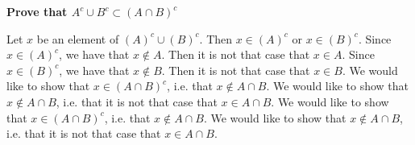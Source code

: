 \documentclass[a4paper,twoside,12pt]{article} %
\makeatletter
\DeclareRobustCommand{\_}{%
  \leavevmode\vbox{%
    \hrule\@width.4em
          \@height-.16ex
          \@depth\dimexpr.16ex+.28pt\relax}}
\makeatother
\begin{document}
{\begin{center} \large \textbf{Prove that $A^c \cup B^c \subset (A \cap B)^c $}\end{center}}\nopagebreak[4]

\begin{center}
\begin{minipage}{120mm}
Let $x$ be an element of $(A)^c\cup (B)^c$. Then $x\in (A)^c$ or $x\in (B)^c$. Since $x\in (A)^c$, we have that $x\notin A$. Then it is not that case that $x\in A$. Since $x\in (B)^c$, we have that $x\notin B$. Then it is not that case that $x\in B$. We would like to show that $x\in (A\cap B)^c$, i.e. that $x\notin A\cap B$. We would like to show that $x\notin A\cap B$, i.e. that it is not that case that $x\in A\cap B$. We would like to show that $x\in (A\cap B)^c$, i.e. that $x\notin A\cap B$. We would like to show that $x\notin A\cap B$, i.e. that it is not that case that $x\in A\cap B$.
\end{minipage}
\end{center}
\end{document}
